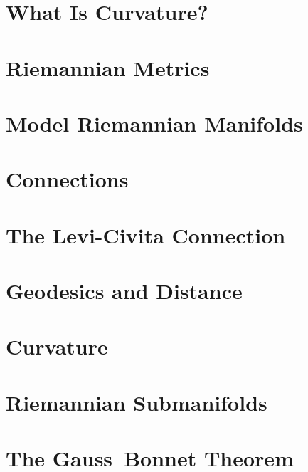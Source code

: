 

\chapter{What Is Curvature?}
\label{chap:what-is-curvature}


\chapter{Riemannian Metrics}
\label{chap:riemannian-metrics}


\chapter{Model Riemannian Manifolds}
\label{chap:model-riemannian-manifolds}


\chapter{Connections}
\label{chap:connections}


\chapter{The Levi-Civita Connection}
\label{chap:levi-civita-connection}


\chapter{Geodesics and Distance}
\label{chap:geodesics-and-distance}


\chapter{Curvature}
\label{chap:curvature}


\chapter{Riemannian Submanifolds}
\label{chap:riemannian-submanifolds}


\chapter{The Gauss--Bonnet Theorem}
\label{chap:gauss-bonnet-theorem}


